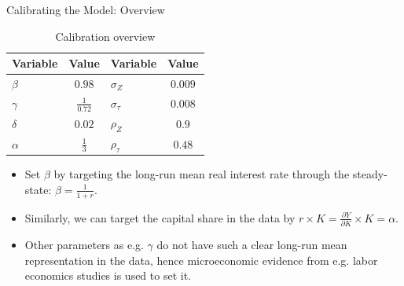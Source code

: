 \documentclass[10pt,c,aspectratio=1610,handout]{beamer}
\begin{document}
\begin{frame}{Calibrating the Model: Overview}%
  \begin{table}%
    \centering%
    \begin{tabular}{l c| l c}%
      \hline%
      Variable & Value & Variable & Value\\%
      \hline \hline%
      $\beta$ & $0.98$ & $\sigma_Z$ & $0.009$\\%
      $\gamma$ & $\frac{1}{0.72}$ & $\sigma_\tau$ & $0.008$\\%
      $\delta$ & $0.02$ & $\rho_Z$ & $0.9$ \\%
      $\alpha$ & $\frac{1}{3}$ & $\rho_\tau$ & $0.48$ \\%
      \hline%
    \end{tabular}%
    \caption{Calibration overview}%
  \end{table}
  \pause%
  \begin{itemize}%
    \item[$\blacktriangleright$] Set $\beta$ by targeting the long-run mean real interest rate through the steady-state: $\beta = \frac{1}{1+r}$.%
    \pause%
    \item[$\blacktriangleright$] Similarly, we can target the capital share in the data by $r \times K = \frac{\partial Y}{\partial K} \times K = \alpha$.%
    \pause%
    \item[$\blacktriangleright$] Other parameters as e.g. $\gamma$ do not have such a clear long-run mean representation in the data, hence microeconomic evidence from e.g. labor economics studies is used to set it.%
  \end{itemize}%
\end{frame}%
\end{document}
